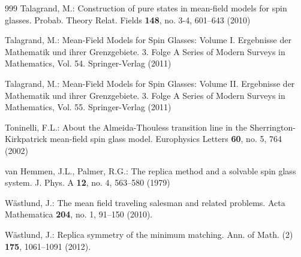 \documentclass[12pt]{article}
\theoremstyle{nonumberplain}
\begin{document}
\begin{thebibliography}{999}
 Talagrand, M.: Construction of pure states in mean-field models for spin glasses. Probab. Theory Relat. Fields \textbf{148}, no. 3-4, 601--643 (2010)

 Talagrand, M.: Mean-Field Models for Spin Glasses: Volume I. Ergebnisse der Mathematik und ihrer Grenzgebiete. 3. Folge A Series of Modern Surveys in Mathematics, Vol. 54. Springer-Verlag (2011)

 Talagrand, M.: Mean-Field Models for Spin Glasses: Volume II. Ergebnisse der Mathematik und ihrer Grenzgebiete. 3. Folge A Series of Modern Surveys in Mathematics, Vol. 55. Springer-Verlag (2011)

 Toninelli, F.L.: About the Almeida-Thouless transition line in the Sherrington-Kirkpatrick mean-field spin glass model. Europhysics Letters \textbf{60}, no. 5, 764 (2002)

 van Hemmen, J.L., Palmer, R.G.: The replica method and a solvable spin glass system. 
J. Phys. A {\bf 12}, no. 4, 563--580 (1979) 

 W\"astlund, J.: The mean field traveling salesman and related problems. Acta Mathematica \textbf{204}, no. 1, 91--150 (2010).

 W\"astlund, J.: Replica symmetry of the minimum matching. Ann. of Math. (2) \textbf{175}, 1061--1091 (2012).





\end{thebibliography}
\end{document}
